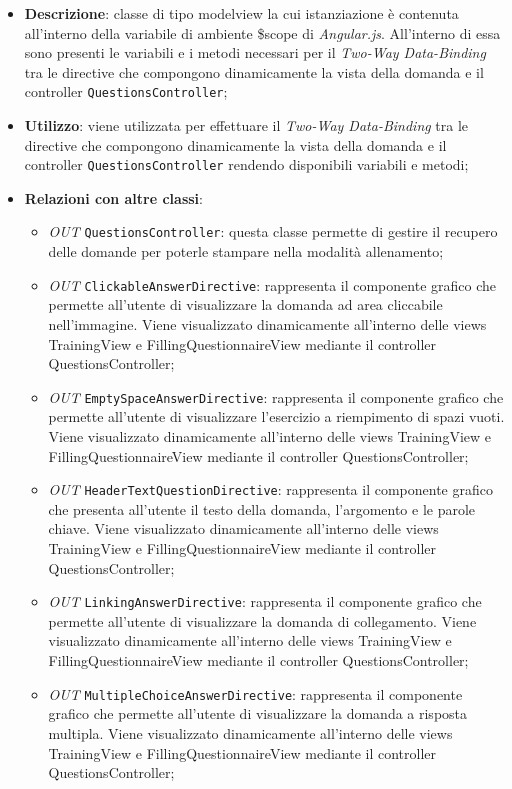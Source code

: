 			\begin{itemize}
				\item \textbf{Descrizione}: classe di tipo modelview la cui istanziazione è contenuta all'interno della variabile di ambiente \$scope di \textit{Angular.js}. All'interno di essa sono presenti le variabili e i metodi necessari per il \textit{Two-Way Data-Binding} tra le directive che compongono dinamicamente la vista della domanda e il controller \texttt{QuestionsController};
				\item \textbf{Utilizzo}: viene utilizzata per effettuare il \textit{Two-Way Data-Binding} tra le directive che compongono dinamicamente la vista della domanda e il controller \texttt{QuestionsController} rendendo disponibili variabili e metodi;
				\item \textbf{Relazioni con altre classi}: 
				\begin{itemize} 
					\item \textit{OUT} \texttt{QuestionsController}: questa classe permette di gestire il recupero delle domande per poterle stampare nella modalità allenamento;
					\item \textit{OUT} \texttt{ClickableAnswerDirective}: rappresenta il componente grafico che permette all'utente di visualizzare la domanda ad area cliccabile nell'immagine. Viene visualizzato dinamicamente all'interno delle views TrainingView e FillingQuestionnaireView mediante il controller QuestionsController;
					\item \textit{OUT} \texttt{EmptySpaceAnswerDirective}: rappresenta il componente grafico che permette all'utente di visualizzare l'esercizio a riempimento di spazi vuoti. Viene visualizzato dinamicamente all'interno delle views TrainingView e FillingQuestionnaireView mediante il controller QuestionsController;
					\item \textit{OUT} \texttt{HeaderTextQuestionDirective}: rappresenta il componente grafico che presenta all'utente il testo della domanda, l'argomento e le parole chiave. Viene visualizzato dinamicamente all'interno delle views TrainingView e FillingQuestionnaireView mediante il controller QuestionsController;
					\item \textit{OUT} \texttt{LinkingAnswerDirective}: rappresenta il componente grafico che permette all'utente di visualizzare la domanda di collegamento. Viene visualizzato dinamicamente all'interno delle views TrainingView e FillingQuestionnaireView mediante il controller QuestionsController;
					\item \textit{OUT} \texttt{MultipleChoiceAnswerDirective}: rappresenta il componente grafico che permette all'utente di visualizzare la domanda a risposta multipla. Viene visualizzato dinamicamente all'interno delle views TrainingView e FillingQuestionnaireView mediante il controller QuestionsController;

\end{itemize}
\end{itemize}
